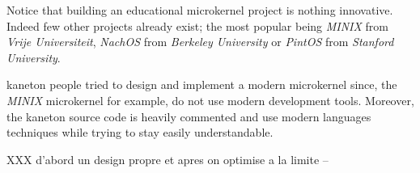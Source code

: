 Notice that building an educational microkernel project is nothing innovative.
Indeed few other projects already exist; the most popular being \textit{MINIX}
from \textit{Vrije Universiteit}, \textit{NachOS} from \textit{Berkeley
University} or \textit{PintOS} from \textit{Stanford University}.

kaneton people tried to design and implement a modern microkernel since, the
\textit{MINIX} microkernel for example, do not use modern development tools.
Moreover, the kaneton source code is heavily commented and use modern
languages techniques while trying to stay easily understandable.

XXX d'abord un design propre et apres on optimise a la limite
--
